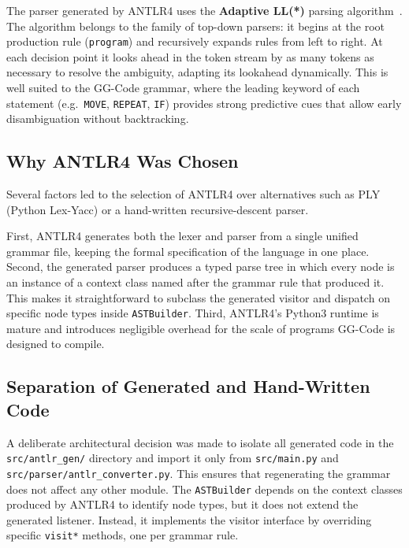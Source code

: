 The parser generated by ANTLR4 uses the \textbf{Adaptive LL(*)} parsing algorithm~\cite{parr_adaptive_2011}. The algorithm belongs to the family of top-down parsers: it begins at the root production rule (\texttt{program}) and recursively expands rules from left to right. At each decision point it looks ahead in the token stream by as many tokens as necessary to resolve the ambiguity, adapting its lookahead dynamically. This is well suited to the GG-Code grammar, where the leading keyword of each statement (e.g.\ \texttt{MOVE}, \texttt{REPEAT}, \texttt{IF}) provides strong predictive cues that allow early disambiguation without backtracking.

\subsection*{Why ANTLR4 Was Chosen}

Several factors led to the selection of ANTLR4 over alternatives such as PLY (Python Lex-Yacc) or a hand-written recursive-descent parser.

First, ANTLR4 generates both the lexer and parser from a single unified grammar file, keeping the formal specification of the language in one place. Second, the generated parser produces a typed parse tree in which every node is an instance of a context class named after the grammar rule that produced it. This makes it straightforward to subclass the generated visitor and dispatch on specific node types inside \texttt{ASTBuilder}. Third, ANTLR4's Python3 runtime is mature and introduces negligible overhead for the scale of programs GG-Code is designed to compile.

\subsection*{Separation of Generated and Hand-Written Code}

A deliberate architectural decision was made to isolate all generated code in the \texttt{src/antlr\_gen/} directory and import it only from \texttt{src/main.py} and \texttt{src/parser/antlr\_converter.py}. This ensures that regenerating the grammar does not affect any other module. The \texttt{ASTBuilder} depends on the context classes produced by ANTLR4 to identify node types, but it does not extend the generated listener. Instead, it implements the visitor interface by overriding specific \texttt{visit*} methods, one per grammar rule.

